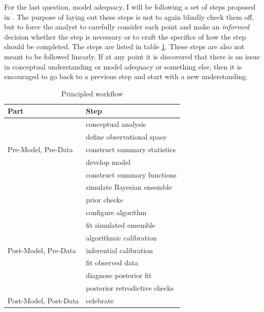 \documentclass[11pt, oneside, openany]{scrbook}
\begin{document}
For the last question, model adequacy, I will be following a set of steps proposed in \citet{betancourt2020}. The purpose of laying out these steps is not to again blindly check them off, but to force the analyst to carefully consider each point and make an \emph{informed} decision whether the step is necessary or to craft the specifics of how the step should be completed. The steps are listed in table \ref{tab:ch030-workflow-steps}. These steps are also not meant to be followed linearly. If at any point it is discovered that there is an issue in conceptual understanding or model adequacy or something else, then it is encouraged to go back to a previous step and start with a new understanding.

\begin{table}[!h]

\caption{\label{tab:ch030-workflow-steps}Principled workflow}
\centering
\begin{tabular}[t]{ll}
\toprule
Part & Step\\
\midrule
 & conceptual analysis\\
\cmidrule{2-2}
 & define observational space\\
\cmidrule{2-2}
\multirow[t]{-3}{*}{\raggedright\arraybackslash Pre-Model, Pre-Data} & construct summary statistics\\
\cmidrule{1-2}
 & develop model\\
\cmidrule{2-2}
 & construct summary functions\\
\cmidrule{2-2}
 & simulate Bayesian ensemble\\
\cmidrule{2-2}
 & prior checks\\
\cmidrule{2-2}
 & configure algorithm\\
\cmidrule{2-2}
 & fit simulated ensemble\\
\cmidrule{2-2}
 & algorithmic calibration\\
\cmidrule{2-2}
\multirow[t]{-8}{*}{\raggedright\arraybackslash Post-Model, Pre-Data} & inferential calibration\\
\cmidrule{1-2}
 & fit observed data\\
\cmidrule{2-2}
 & diagnose posterior fit\\
\cmidrule{2-2}
 & posterior retrodictive checks\\
\cmidrule{2-2}
\multirow[t]{-4}{*}{\raggedright\arraybackslash Post-Model, Post-Data} & celebrate\\
\bottomrule
\end{tabular}
\end{table}
\end{document}
